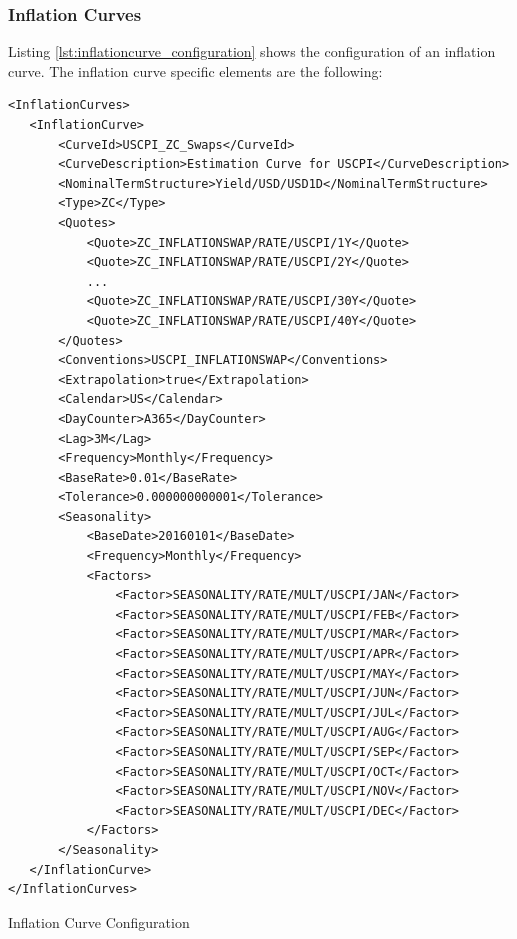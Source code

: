 \documentclass[12pt, a4paper]{article}
\newenvironment{longlisting}{\captionsetup{type=listing}}{}
\begin{document}
\subsubsection{Inflation Curves}

Listing \ref{lst:inflationcurve_configuration} shows the configuration of an inflation curve. The inflation curve specific
elements are the following:

\begin{longlisting}
\begin{verbatim}
<InflationCurves>
   <InflationCurve>
       <CurveId>USCPI_ZC_Swaps</CurveId>
       <CurveDescription>Estimation Curve for USCPI</CurveDescription>
       <NominalTermStructure>Yield/USD/USD1D</NominalTermStructure>
       <Type>ZC</Type>
       <Quotes>
           <Quote>ZC_INFLATIONSWAP/RATE/USCPI/1Y</Quote>
           <Quote>ZC_INFLATIONSWAP/RATE/USCPI/2Y</Quote>
           ...
           <Quote>ZC_INFLATIONSWAP/RATE/USCPI/30Y</Quote>
           <Quote>ZC_INFLATIONSWAP/RATE/USCPI/40Y</Quote>
       </Quotes>
       <Conventions>USCPI_INFLATIONSWAP</Conventions>
       <Extrapolation>true</Extrapolation>
       <Calendar>US</Calendar>
       <DayCounter>A365</DayCounter>
       <Lag>3M</Lag>
       <Frequency>Monthly</Frequency>
       <BaseRate>0.01</BaseRate>
       <Tolerance>0.000000000001</Tolerance>
       <Seasonality>
           <BaseDate>20160101</BaseDate>
           <Frequency>Monthly</Frequency>
           <Factors>
               <Factor>SEASONALITY/RATE/MULT/USCPI/JAN</Factor>
               <Factor>SEASONALITY/RATE/MULT/USCPI/FEB</Factor>
               <Factor>SEASONALITY/RATE/MULT/USCPI/MAR</Factor>
               <Factor>SEASONALITY/RATE/MULT/USCPI/APR</Factor>
               <Factor>SEASONALITY/RATE/MULT/USCPI/MAY</Factor>
               <Factor>SEASONALITY/RATE/MULT/USCPI/JUN</Factor>
               <Factor>SEASONALITY/RATE/MULT/USCPI/JUL</Factor>
               <Factor>SEASONALITY/RATE/MULT/USCPI/AUG</Factor>
               <Factor>SEASONALITY/RATE/MULT/USCPI/SEP</Factor>
               <Factor>SEASONALITY/RATE/MULT/USCPI/OCT</Factor>
               <Factor>SEASONALITY/RATE/MULT/USCPI/NOV</Factor>
               <Factor>SEASONALITY/RATE/MULT/USCPI/DEC</Factor>
           </Factors>
       </Seasonality>
   </InflationCurve>
</InflationCurves>
\end{verbatim}
\caption{Inflation Curve Configuration}
\label{lst:inflationcurve_configuration}
\end{longlisting}
\end{document}
